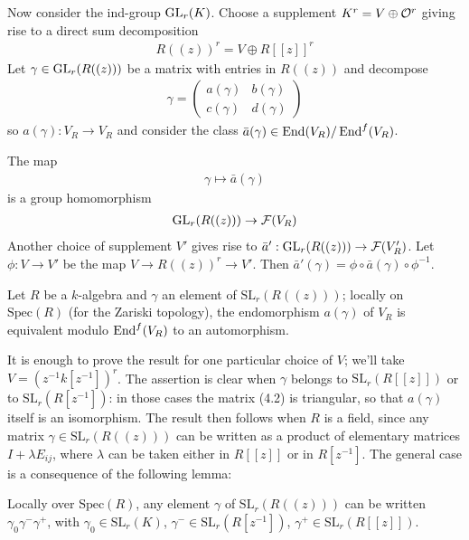 \documentclass[12pt]{article}
\begin{document}
Now consider the ind-group $\operatorname{GL}_r(K)$. Choose a supplement $K^r = V \oplus {\mathcal{O}}^r$ giving rise to a direct sum decomposition \begin{align*}
    R((z))^r = V \oplus R[[z]]^r
\end{align*} Let $\gamma \in \operatorname{GL}_r(R((z)))$ be a matrix with entries in $R((z))$ and decompose \begin{align*}
    \gamma = \begin{pmatrix}
                 a(\gamma) & b(\gamma) \\
                 c(\gamma) & d(\gamma)
             \end{pmatrix}
\end{align*}
so $a(\gamma):V_R \to V_R$ and consider the class $\bar{a}(\gamma) \in \operatorname{End}(V_R) / \operatorname{End}^f(V_R)$.

\begin{proposition}
    The map \begin{align*}
        \gamma \mapsto \bar{a}(\gamma)
    \end{align*} is a group homomorphism \begin{align*}
        \operatorname{GL}_r(R((z))) \to {\mathcal{F}}(V_R)
    \end{align*} Another choice of supplement $V'$ gives rise to $\bar{a}':\operatorname{GL}_r(R((z))) \to {\mathcal{F}}(V_R')$. Let $\phi:V \to V'$ be the map $V \to R((z))^r \to V'$. Then $\bar{a}'(\gamma) = \phi \circ \bar{a}(\gamma) \circ \phi^{-1}$.
\end{proposition}

\begin{proposition}
    Let $R$ be a $k$-algebra and $\gamma$ an element of $\text{SL}_r(R((z)))$; locally on $\text{Spec}(R)$ (for the Zariski topology), the endomorphism $a(\gamma)$ of $V_R$ is equivalent modulo $\operatorname{End}^f(V_R)$ to an automorphism.
\end{proposition}

It is enough to prove the result for one particular choice of $V$; we'll take $V = (z^{-1}k[z^{-1}])^r$. The assertion is clear when $\gamma$ belongs to $\text{SL}_r(R[[z]])$ or to $\text{SL}_r(R[z^{-1}])$: in those cases the matrix (4.2) is triangular, so that $a(\gamma)$ itself is an isomorphism. The result then follows when $R$ is a field, since any matrix $\gamma \in \text{SL}_r(R((z)))$ can be written as a product of elementary matrices $I + \lambda E_{ij}$, where $\lambda$ can be taken either in $R[[z]]$ or in $R[z^{-1}]$. The general case is a consequence of the following lemma:

\begin{lemma}
    Locally over $\text{Spec}(R)$, any element $\gamma$ of $\text{SL}_r(R((z)))$ can be written $\gamma_0\gamma^-\gamma^+$, with $\gamma_0 \in \text{SL}_r(K)$, $\gamma^- \in \text{SL}_r(R[z^{-1}])$, $\gamma^+ \in \text{SL}_r(R[[z]])$.
\end{lemma}
\end{document}
